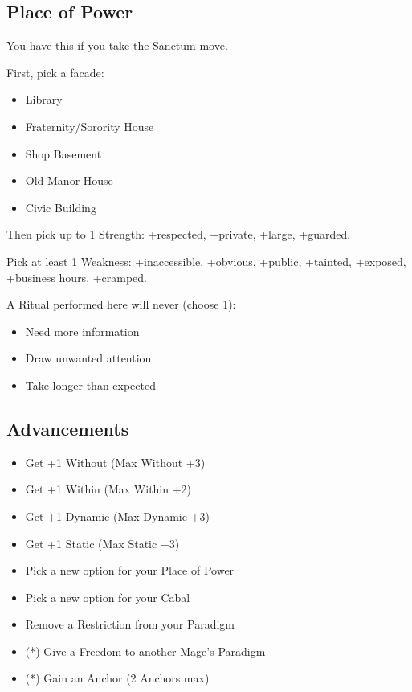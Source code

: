 \documentclass[
  oneside,
  statementpaper,
  9pt]{memoir}
\begin{document}
\hypertarget{place-of-power}{%
\subsection{Place of Power}\label{place-of-power}}

You have this if you take the Sanctum move.

First, pick a facade:

\begin{itemize}
\tightlist
\item
  Library
\item
  Fraternity/Sorority House
\item
  Shop Basement
\item
  Old Manor House
\item
  Civic Building
\end{itemize}

Then pick up to 1 Strength: +respected, +private, +large, +guarded.

Pick at least 1 Weakness: +inaccessible, +obvious, +public, +tainted,
+exposed, +business hours, +cramped.

A Ritual performed here will never (choose 1):

\begin{itemize}
\tightlist
\item
  Need more information
\item
  Draw unwanted attention
\item
  Take longer than expected
\end{itemize}

\hypertarget{advancements}{%
\subsection{Advancements}\label{advancements}}

\begin{itemize}
\tightlist
\item
  Get +1 Without (Max Without +3)
\item
  Get +1 Within (Max Within +2)
\item
  Get +1 Dynamic (Max Dynamic +3)
\item
  Get +1 Static (Max Static +3)
\item
  Pick a new option for your Place of Power
\item
  Pick a new option for your Cabal
\item
  Remove a Restriction from your Paradigm
\item
  (*) Give a Freedom to another Mage's Paradigm
\item
  (*) Gain an Anchor (2 Anchors max)
\end{itemize}
\end{document}
